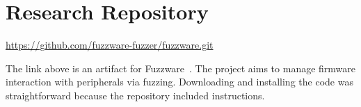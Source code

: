 \documentclass{article}
\begin{document}
\section{Research Repository}  \label{sec-research-repository}

\url{https://github.com/fuzzware-fuzzer/fuzzware.git}

The link above is an artifact for  Fuzzware~\cite{scharnowski2022fuzzware}. The project aims to manage firmware interaction with peripherals via fuzzing. Downloading and installing the code was straightforward because the repository included instructions.





\end{document}
